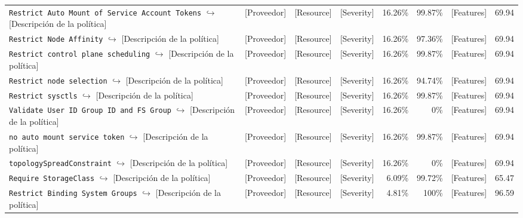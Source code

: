 \begin{table}[ht]
\begin{tabular}{lcccrrrr}
\makecell[l]{\texttt{Restrict Auto Mount of Service Account Tokens} \\ $\hookrightarrow$ [Descripción de la política]} & [Proveedor] & [Resource] & [Severity] & 16.26\% & 99.87\% & [Features] & 69.94 \\
\makecell[l]{\texttt{Restrict Node Affinity} \\ $\hookrightarrow$ [Descripción de la política]} & [Proveedor] & [Resource] & [Severity] & 16.26\% & 97.36\% & [Features] & 69.94 \\
\makecell[l]{\texttt{Restrict control plane scheduling} \\ $\hookrightarrow$ [Descripción de la política]} & [Proveedor] & [Resource] & [Severity] & 16.26\% & 99.87\% & [Features] & 69.94 \\
\makecell[l]{\texttt{Restrict node selection} \\ $\hookrightarrow$ [Descripción de la política]} & [Proveedor] & [Resource] & [Severity] & 16.26\% & 94.74\% & [Features] & 69.94 \\
\makecell[l]{\texttt{Restrict sysctls} \\ $\hookrightarrow$ [Descripción de la política]} & [Proveedor] & [Resource] & [Severity] & 16.26\% & 99.87\% & [Features] & 69.94 \\
\makecell[l]{\texttt{Validate User ID Group ID and FS Group} \\ $\hookrightarrow$ [Descripción de la política]} & [Proveedor] & [Resource] & [Severity] & 16.26\% & 0\% & [Features] & 69.94 \\
\makecell[l]{\texttt{no auto mount service token} \\ $\hookrightarrow$ [Descripción de la política]} & [Proveedor] & [Resource] & [Severity] & 16.26\% & 99.87\% & [Features] & 69.94 \\
\makecell[l]{\texttt{topologySpreadConstraint} \\ $\hookrightarrow$ [Descripción de la política]} & [Proveedor] & [Resource] & [Severity] & 16.26\% & 0\% & [Features] & 69.94 \\
\makecell[l]{\texttt{Require StorageClass} \\ $\hookrightarrow$ [Descripción de la política]} & [Proveedor] & [Resource] & [Severity] & 6.09\% & 99.72\% & [Features] & 65.47 \\
\makecell[l]{\texttt{Restrict Binding System Groups} \\ $\hookrightarrow$ [Descripción de la política]} & [Proveedor] & [Resource] & [Severity] & 4.81\% & 100\% & [Features] & 96.59 \\

\end{tabular}
\end{table}
